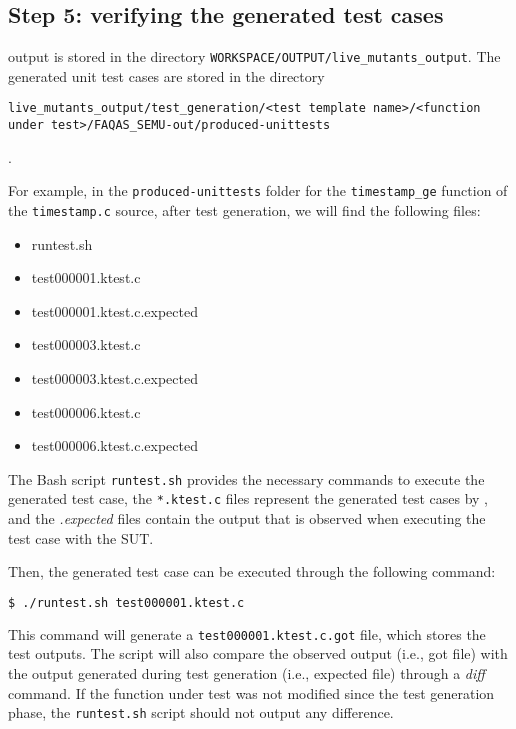 \subsection{Step 5: verifying the generated test cases}

\SEMUS output is stored in the directory \texttt{WORKSPACE/OUTPUT/live\_mutants\_output}. The generated unit test cases are stored in the directory \begin{small}\texttt{live\_mutants\_output/test\_generation/<test template name>/<function under test>/FAQAS\_SEMU-out/produced-unittests}\end{small}.

For example, in the \texttt{produced-unittests} folder for the \texttt{timestamp\_ge} function of the \texttt{timestamp.c} source, after test generation, we will find the following files:

\begin{itemize}
\item runtest.sh
\item test000001.ktest.c
\item test000001.ktest.c.expected
\item test000003.ktest.c
\item test000003.ktest.c.expected
\item test000006.ktest.c
\item test000006.ktest.c.expected
\end{itemize}

The Bash script \texttt{runtest.sh} provides the necessary commands to execute the generated test case, the \texttt{*.ktest.c} files represent the generated test cases by \SEMUS, and the \emph{.expected} files contain the output that is observed when executing the test case with the SUT.

Then, the generated test case can be executed through the following command:

\begin{lstlisting}[language=bash]
 $ ./runtest.sh test000001.ktest.c
\end{lstlisting}

This command will generate a \texttt{test000001.ktest.c.got} file, which stores the test outputs. The script will also compare the observed output (i.e., got file) with the output generated during test generation (i.e., expected file) through a \emph{diff} command. If the function under test was not modified since the test generation phase, the \texttt{runtest.sh} script should not output any difference.
